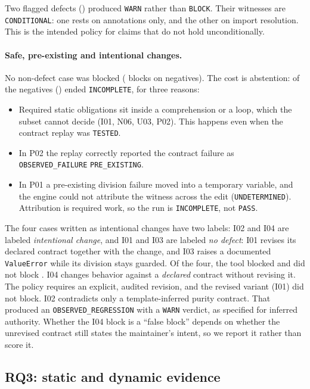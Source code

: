 \documentclass[10pt,twocolumn]{article}
\newcommand{\res}[1]{\texttt{\small #1}}
\begin{document}
Two flagged defects (\SeedWarnFlags) produced \res{WARN} rather than \res{BLOCK}. Their witnesses are
\res{CONDITIONAL}: one rests on annotations only, and the other on import resolution. This is the intended policy for
claims that do not hold unconditionally.



\paragraph{Safe, pre-existing and intentional changes.}
No non-defect case was blocked (\SeedBlocksOnNegatives{} blocks on negatives). The cost is abstention:
\SeedNegIncomplete{} of the \SeedNeg{} negatives (\SeedNegIncompleteCases) ended \res{INCOMPLETE}, for three reasons:
\begin{itemize}
\item Required static obligations sit inside a comprehension or a loop, which the subset cannot decide (I01, N06, U03,
  P02). This happens even when the contract replay was \res{TESTED}.
\item In P02 the replay correctly reported the contract failure as \res{OBSERVED\_FAILURE} \res{PRE\_EXISTING}.
\item In P01 a pre-existing division failure moved into a temporary variable, and the engine could not attribute the
  witness across the edit (\res{UNDETERMINED}). Attribution is required work, so the run is \res{INCOMPLETE}, not
  \res{PASS}.
\end{itemize}
The four cases written as intentional changes have two labels: I02 and I04 are labeled \emph{intentional change}, and
I01 and I03 are labeled \emph{no defect}: I01 revises its declared contract together with the change, and I03 raises a
documented \texttt{ValueError} while its division stays guarded. Of the four,
the tool blocked \SeedIntentBlocked{} and did not block \SeedIntentNotBlocked{}. I04 changes behavior against a \emph{declared} contract without revising it. The policy requires
an explicit, audited revision, and the revised variant (I01) did not block. I02 contradicts only a template-inferred
purity contract. That produced an \res{OBSERVED\_REGRESSION} with a \res{WARN} verdict, as specified for inferred
authority. Whether the I04 block is a ``false block'' depends on whether the unrevised contract still states the
maintainer's intent, so we report it rather than score it.

\subsection{RQ3: static and dynamic evidence}
\end{document}
